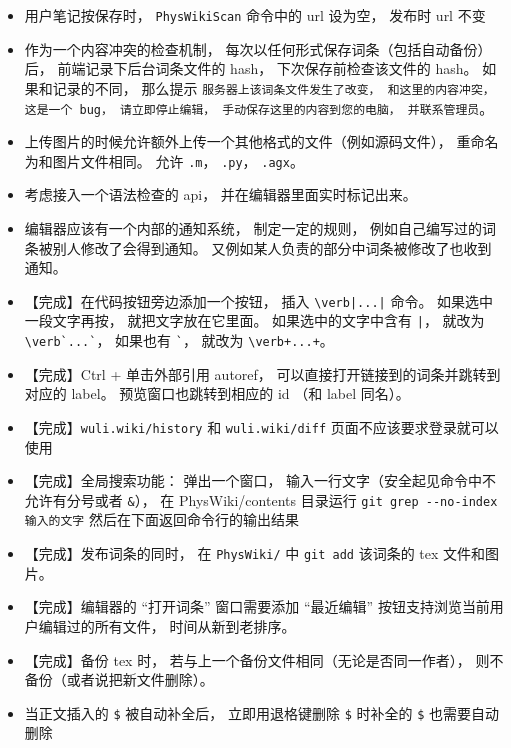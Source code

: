 \begin{itemize}
\item 用户笔记按保存时， \verb|PhysWikiScan| 命令中的 url 设为空， 发布时 url 不变

\item 作为一个内容冲突的检查机制， 每次以任何形式保存词条（包括自动备份）后， 前端记录下后台词条文件的 hash， 下次保存前检查该文件的 hash。 如果和记录的不同， 那么提示 \verb|服务器上该词条文件发生了改变， 和这里的内容冲突， 这是一个 bug， 请立即停止编辑， 手动保存这里的内容到您的电脑， 并联系管理员|。

\item 上传图片的时候允许额外上传一个其他格式的文件（例如源码文件）， 重命名为和图片文件相同。 允许 \verb|.m|， \verb|.py|， \verb|.agx|。

\item 考虑接入一个语法检查的 api， 并在编辑器里面实时标记出来。

\item 编辑器应该有一个内部的通知系统， 制定一定的规则， 例如自己编写过的词条被别人修改了会得到通知。 又例如某人负责的部分中词条被修改了也收到通知。

\item 【完成】在代码按钮旁边添加一个按钮， 插入 \verb`\verb|...|` 命令。 如果选中一段文字再按， 就把文字放在它里面。 如果选中的文字中含有 \verb`|`， 就改为 \verb|\verb`...`|， 如果也有 \verb|`|， 就改为 \verb|\verb+...+|。

\item 【完成】Ctrl + 单击外部引用 autoref， 可以直接打开链接到的词条并跳转到对应的 label。 预览窗口也跳转到相应的 id （和 label 同名）。

\item 【完成】\verb|wuli.wiki/history| 和 \verb|wuli.wiki/diff| 页面不应该要求登录就可以使用

\item 【完成】全局搜索功能： 弹出一个窗口， 输入一行文字（安全起见命令中不允许有分号或者 \verb|&|）， 在 PhysWiki/contents 目录运行 \verb`git grep --no-index 输入的文字` 然后在下面返回命令行的输出结果

\item 【完成】发布词条的同时， 在 \verb|PhysWiki/| 中 \verb|git add| 该词条的 tex 文件和图片。

\item 【完成】编辑器的 “打开词条” 窗口需要添加 “最近编辑” 按钮支持浏览当前用户编辑过的所有文件， 时间从新到老排序。

\item 【完成】备份 tex 时， 若与上一个备份文件相同（无论是否同一作者）， 则不备份（或者说把新文件删除）。
\item 当正文插入的 \verb|$| 被自动补全后， 立即用退格键删除 \verb|$| 时补全的 \verb|$| 也需要自动删除


\end{itemize}
